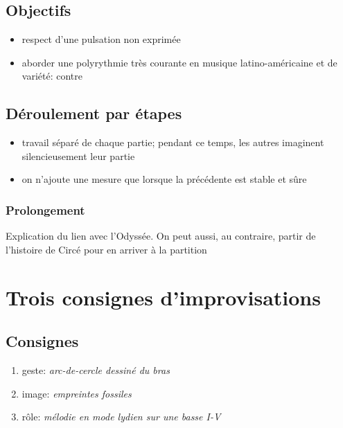 \documentclass[a4paper,11pt,bibliography=totoc,numbers=noenddot,listof=flat,DIV=11,BCOR=0mm]{scrreprt}%
\begin{document}
\section*{Objectifs}
\begin{itemize}
\item respect d'une pulsation non exprimée
\item aborder une polyrythmie très courante en musique latino-américaine et de variété:  contre 
\end{itemize}


\section*{Déroulement par étapes}
\begin{itemize}
\item travail séparé de chaque partie; pendant ce temps, les autres imaginent silencieusement leur partie
\item on n'ajoute une mesure que lorsque la précédente est stable et sûre
\end{itemize}

\subsection*{Prolongement}
Explication du lien avec l'Odyssée. On peut aussi, au contraire, partir de l'histoire de Circé pour en arriver à la partition




\chapter{Trois consignes d'improvisations}

\section*{Consignes}
\begin{enumerate}
\item geste: \emph{arc-de-cercle dessiné du bras}
\item image: \emph{empreintes fossiles}
\item rôle: \emph{mélodie en mode lydien sur une basse I-V}
\end{enumerate}
\end{document}
